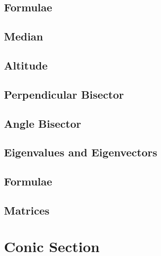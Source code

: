 \documentclass[journal]{IEEEtran}
\begin{document}
\subsection{Formulae}

\subsection{Median}

\subsection{Altitude}

\subsection{Perpendicular Bisector}

\subsection{Angle Bisector}

\subsection{Eigenvalues and Eigenvectors}

\subsection{Formulae}

\subsection{Matrices}

\newpage
\section{Conic Section}

\fi
\end{document}
